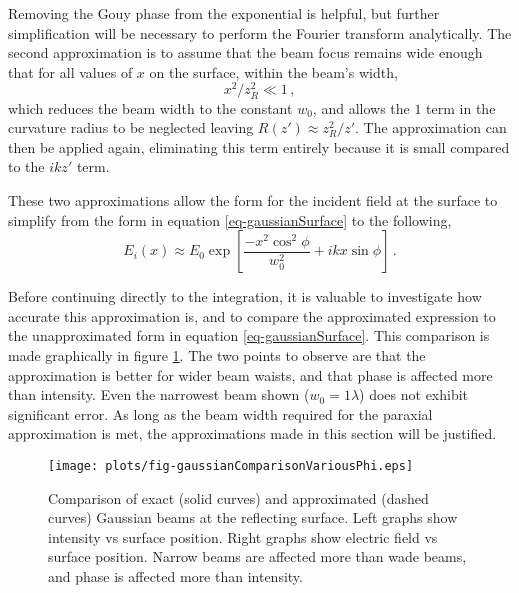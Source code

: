 \documentclass[12pt]{uthesis-v12}
\begin{document}
Removing the Gouy phase from the exponential is helpful, but further simplification will be necessary to perform the Fourier transform analytically. The second approximation is to assume that the beam focus remains wide enough that for all values of $x$ on the surface, within the beam's width,
\begin{equation}\label{eq-approximation}
x^2/z_R^2 \ll 1\,,
\end{equation}
which reduces the beam width to the constant $w_0$, and allows the $1$ term in the curvature radius to be neglected leaving $R(z')\approx z_R^2/z'$. The approximation can then be applied again, eliminating this term entirely because it is small compared to the $ikz'$ term.

These two approximations allow the form for the incident field at the surface to simplify from the form in equation \ref{eq-gaussianSurface} to the following,
\begin{equation}\label{eq-gaussianSurfaceApprox}
E_i(x) \approx E_0 \exp\left[
\frac{-x^2\cos^2\phi}{w_0^2}+ikx\sin\phi
\right]\,.
\end{equation}

Before continuing directly to the integration, it is valuable to investigate how accurate this approximation is, and to compare the approximated expression to the unapproximated form in equation \ref{eq-gaussianSurface}. This comparison is made graphically in figure \ref{fig-gaussianComparisonVariousPhi}. The two points to observe are that the approximation is better for wider beam waists, and that phase is affected more than intensity. Even the narrowest beam shown ($w_0=1\lambda$) does not exhibit significant error. As long as the beam width required for the paraxial approximation is met, the approximations made in this section will be justified.

\begin{figure}[htb]
\centering
\texttt{[image: plots/fig-gaussianComparisonVariousPhi.eps]}
\caption[Comparison of exact and approximated Gaussian beams at the reflecting surface.]{Comparison of exact (solid curves) and approximated (dashed curves) Gaussian beams at the  reflecting surface. Left graphs show intensity vs surface position. Right graphs show electric field vs surface position. Narrow beams are affected more than wade beams, and phase is affected more than intensity.
 \label{fig-gaussianComparisonVariousPhi}}
\end{figure}
\end{document}
